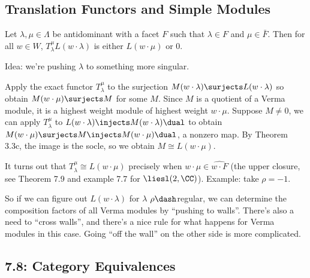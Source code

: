 \hypertarget{translation-functors-and-simple-modules}{%
\subsection{Translation Functors and Simple
Modules}\label{translation-functors-and-simple-modules}}

\begin{description}
\tightlist
\item[Proposition (Translation Functors Applied to L for Antidominant
Weights)]
Let \(\lambda, \mu \in \Lambda\) be antidominant with a facet \(F\) such
that \(\lambda \in F\) and \(\mu \in \bar F\). Then for all \(w\in W\),
\(T_\lambda^\mu L(w\cdot \lambda)\) is either \(L(w\cdot \mu)\) or 0.
\end{description}

Idea: we're pushing \(\lambda\) to something more singular.

\begin{description}
\tightlist
\item[Proof]
Apply the exact functor \(T_\lambda^\mu\) to the surjection
\(M(w\cdot \lambda) \surjects L(w\cdot \lambda)\) so obtain
\(M(w\cdot \mu) \surjects M\) for some \(M\). Since \(M\) is a quotient
of a Verma module, it is a highest weight module of highest weight
\(w\cdot \mu\). Suppose \(M\neq 0\), we can apply \(T_\lambda^\mu\) to
\(L(w\cdot \lambda) \injects M(w\cdot \lambda) \dual\) to obtain
\(M(w\cdot \mu) \surjects M \injects M(w\cdot \mu) \dual\), a nonzero
map. By Theorem 3.3c, the image is the socle, so we obtain
\(M \cong L(w\cdot \mu)\).
\end{description}

It turns out that \(T_\lambda^\mu \cong L(w\cdot \mu)\) precisely when
\(w\cdot \mu \in \hat{w\cdot F}\) (the upper closure, see Theorem 7.9
and example 7.7 for \(\liesl(2, \CC)\)). Example: take \(\rho = -1\).

So if we can figure out \(L(w\cdot \lambda)\) for \(\lambda\)
\(\rho\dash\)regular, we can determine the composition factors of all
Verma modules by ``pushing to walls''. There's also a need to ``cross
walls'', and there's a nice rule for what happens for Verma modules in
this case. Going ``off the wall'' on the other side is more complicated.

\hypertarget{category-equivalences}{%
\subsection{7.8: Category Equivalences}\label{category-equivalences}}

